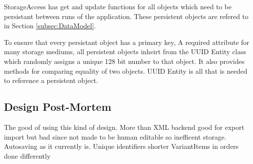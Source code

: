 StorageAccess has get and update functions for all objects which need to be persistant between runs of the application. These persistent objects are refered to in Section \ref{subsec:DataModel}. 

To ensure that every persistant object has a primary key, A required attribute for many storage mediums, all persistent objects inheirt from the UUID Entity class which randomly assigns a unique 128 bit number to that object. It also provides methods for comparing equality of two objects. UUID Entity is all that is needed to reference a persistent object. 




\subsection{Design Post-Mortem}
The good of using this kind of design.
More than XML backend good for export import but bad since not made to be human editable so inefficent storage.
Autosaving as it currently is.
Unique identifiers shorter
VariantItems in orders done differently